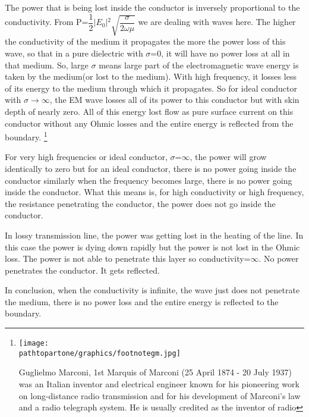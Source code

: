 The power that is being lost inside the conductor is inversely proportional to the conductivity. From P=$\dfrac{1}{2}$$\lvert E_{0}\rvert$$^{2}$$\sqrt{\dfrac{\sigma}{2\omega\mu}}$ we are dealing with waves here. The higher the conductivity of the medium it propagates the more the power loss of this wave, so that in a pure dielectric with $\sigma$=0, it will have no power loss at all in that medium. So, large $\sigma$ means large part of the electromagnetic wave energy is taken by the medium(or lost to the medium). With high frequency, it  losses less of its energy to the medium through which it propagates. So for ideal conductor with $\sigma$$\longrightarrow$$\infty$, the EM wave losses all of its power to this conductor but with skin depth of nearly zero. All of this energy lost flow as pure surface current on this conductor without any Ohmic losses and the entire energy is reflected from the boundary.
\footnote{\texttt{[image: \\pathtopartone/graphics/footnotegm.jpg]}

Guglielmo Marconi, 1st Marquis of Marconi (25 April 1874 - 20 July 1937) was an Italian inventor and electrical engineer known for his pioneering work on long-distance radio transmission and for his development of Marconi's law and a radio telegraph system. He is usually credited as the inventor of radio}

For very high frequencies or ideal conductor, $\sigma$=$\infty$, the power will grow identically to zero but for an ideal conductor, there is no power going inside the conductor similarly when the frequency becomes large, there is no power going inside the conductor. What this means is, for high conductivity or high frequency, the resistance penetrating the conductor, the power does not go inside the conductor.

In lossy transmission line, the power was getting lost in the heating of the line. In this case the power is dying down rapidly but the power is not lost in the Ohmic loss. The power is not able to penetrate this layer so conductivity=$\infty$. No power penetrates the conductor. It gets reflected.

In conclusion, when the conductivity is infinite, the wave just does not penetrate the medium, there is no power loss and the entire energy is reflected to the boundary.
